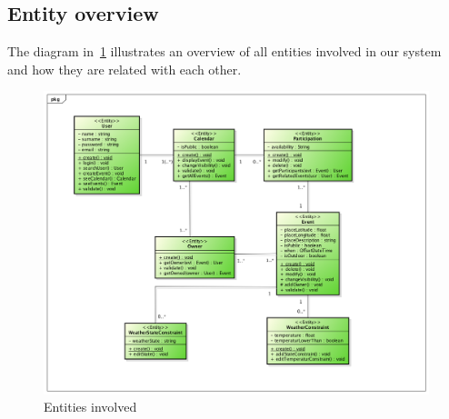 \begin{itemize}
\subsection{Entity overview}
The diagram in~\ref{fig:entityovervie} illustrates an overview of all entities involved in our system and how they are related with each other.
 \begin{center}
 \begin{figure}[H]
    \includegraphics[width=1\textwidth]{../BCEDiagram/BCE/EntityOverview/Entity.png}
    \caption{Entities involved}
     \label{fig:entityovervie}
     \end{figure}
   \end{center}  



\end{itemize}
